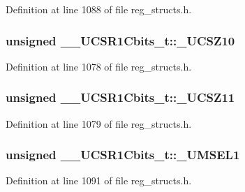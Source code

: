 Definition at line 1088 of file reg\+\_\+structs.\+h.

\hypertarget{union_____u_c_s_r1_cbits__t_a093efd44f39a643b5dfed152957cbcae}{
\subsubsection[{\+\_\+\+U\+C\+S\+Z10}]{\setlength{\rightskip}{0pt plus 5cm}unsigned \+\_\+\+\_\+\+U\+C\+S\+R1\+Cbits\+\_\+t\+::\+\_\+\+U\+C\+S\+Z10}}\label{union_____u_c_s_r1_cbits__t_a093efd44f39a643b5dfed152957cbcae}


Definition at line 1078 of file reg\+\_\+structs.\+h.

\hypertarget{union_____u_c_s_r1_cbits__t_a81f88dab4a5b2f43292fe3e5f0aaf358}{
\subsubsection[{\+\_\+\+U\+C\+S\+Z11}]{\setlength{\rightskip}{0pt plus 5cm}unsigned \+\_\+\+\_\+\+U\+C\+S\+R1\+Cbits\+\_\+t\+::\+\_\+\+U\+C\+S\+Z11}}\label{union_____u_c_s_r1_cbits__t_a81f88dab4a5b2f43292fe3e5f0aaf358}


Definition at line 1079 of file reg\+\_\+structs.\+h.

\hypertarget{union_____u_c_s_r1_cbits__t_a3a11e7d8edd576d199fbee42fdd4f622}{
\subsubsection[{\+\_\+\+U\+M\+S\+E\+L1}]{\setlength{\rightskip}{0pt plus 5cm}unsigned \+\_\+\+\_\+\+U\+C\+S\+R1\+Cbits\+\_\+t\+::\+\_\+\+U\+M\+S\+E\+L1}}\label{union_____u_c_s_r1_cbits__t_a3a11e7d8edd576d199fbee42fdd4f622}


Definition at line 1091 of file reg\+\_\+structs.\+h.

